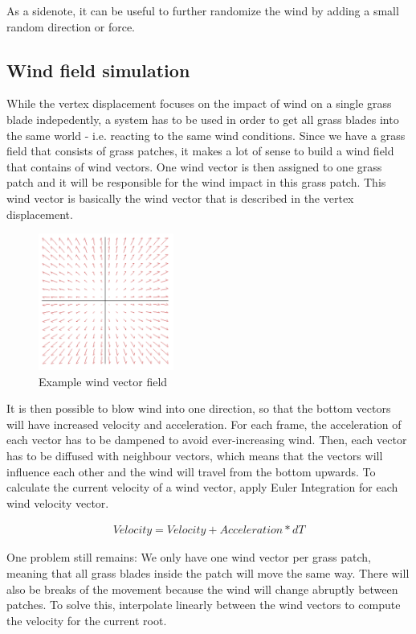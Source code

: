 \documentclass[conference]{acmsiggraph}
\begin{document}
As a sidenote, it can be useful to further randomize the wind by adding a small random direction or force.

\subsection{Wind field simulation}
While the vertex displacement focuses on the impact of wind on a single grass blade indepedently, a system has to be used in order to get all grass blades into the same world - i.e. reacting to the same wind conditions. Since we have a grass field that consists of grass patches, it makes a lot of sense to build a wind field that contains of wind vectors. One wind vector is then assigned to one grass patch and it will be responsible for the wind impact in this grass patch. This wind vector is basically the wind vector that is described in the vertex displacement.

 \begin{figure}[ht]
   \centering
   \includegraphics[width=1.75in]{images/windField}
   \caption{Example wind vector field}
 \end{figure}
 
It is then possible to blow wind into one direction, so that the bottom vectors will have increased velocity and acceleration. For each frame, the acceleration of each vector has to be dampened to avoid ever-increasing wind. Then, each vector has to be diffused with neighbour vectors, which means that the vectors will influence each other and the wind will travel from the bottom upwards. To calculate the current velocity of a wind vector, apply Euler Integration for each wind velocity vector.

\begin{center}
\begin{align}
Velocity = Velocity + Acceleration * dT
\end{align}
\end{center}

One problem still remains: We only have one wind vector per grass patch, meaning that all grass blades inside the patch will move the same way. There will also be breaks of the movement because the wind will change abruptly between patches. To solve this, interpolate linearly between the wind vectors to compute the velocity for the current root.
\end{document}
